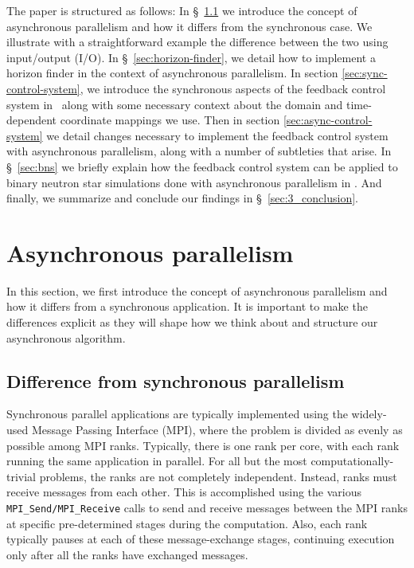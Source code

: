 \begin{bibunit}[unsrtnat]
The paper is structured
as follows: In \S~\ref{sec:async} we introduce the concept of asynchronous
parallelism and how it differs from the synchronous case. We illustrate with a
straightforward example the difference between the two using input/output (I/O).
In \S~\ref{sec:horizon-finder}, we detail how to implement a horizon finder
in the context of asynchronous parallelism. In section
\ref{sec:sync-control-system}, we introduce the synchronous aspects of the
feedback control system in \spectre\ along with some necessary context about the
domain and time-dependent coordinate mappings we use. Then in section
\ref{sec:async-control-system} we detail changes necessary to implement the
feedback control system with asynchronous parallelism, along with a number of
subtleties that arise.  In
\S~\ref{sec:bns} we briefly explain how the
feedback control system can be applied to binary neutron star simulations done
with asynchronous parallelism in \spectre. And finally, we summarize and
conclude our findings in \S~\ref{sec:3_conclusion}.

\section{Asynchronous parallelism}
In this section, we first introduce the concept of asynchronous
parallelism and how it differs from a synchronous application. It is important
to make the differences explicit as they will shape how we think about and
structure our asynchronous algorithm.

\subsection{Difference from synchronous parallelism}\label{sec:async}

Synchronous parallel applications are typically implemented using the
widely-used Message Passing Interface (MPI), where the problem is divided as
evenly as possible among MPI ranks. Typically, there is one rank per
core, with each rank running the same application in parallel. For all
but the most computationally-trivial problems, the ranks are not completely
independent. Instead, ranks must receive messages from each other. This is
accomplished using the various \texttt{MPI\_Send/MPI\_Receive} calls to send and
receive messages between the MPI ranks at specific pre-determined stages during
the computation. Also, each rank typically pauses at each of these
message-exchange stages, continuing execution only after all the ranks have
exchanged messages.


\end{bibunit}
